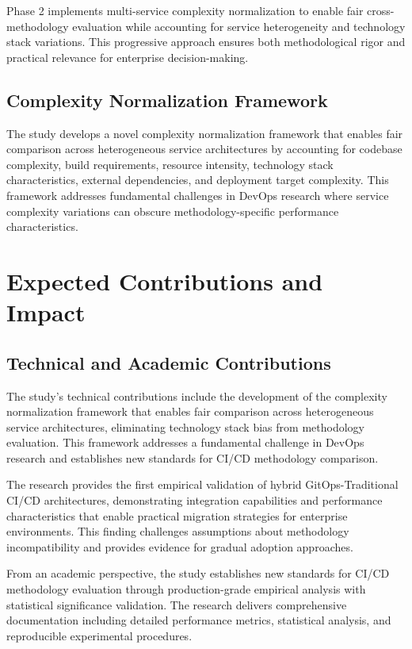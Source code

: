 Phase 2 implements multi-service complexity normalization to enable fair cross-methodology evaluation while accounting for service heterogeneity and technology stack variations. This progressive approach ensures both methodological rigor and practical relevance for enterprise decision-making.

\subsection{Complexity Normalization Framework}
The study develops a novel complexity normalization framework that enables fair comparison across heterogeneous service architectures by accounting for codebase complexity, build requirements, resource intensity, technology stack characteristics, external dependencies, and deployment target complexity. This framework addresses fundamental challenges in DevOps research where service complexity variations can obscure methodology-specific performance characteristics.

\section{Expected Contributions and Impact}

\subsection{Technical and Academic Contributions}
The study's technical contributions include the development of the complexity normalization framework that enables fair comparison across heterogeneous service architectures, eliminating technology stack bias from methodology evaluation. This framework addresses a fundamental challenge in DevOps research and establishes new standards for CI/CD methodology comparison.

The research provides the first empirical validation of hybrid GitOps-Traditional CI/CD architectures, demonstrating integration capabilities and performance characteristics that enable practical migration strategies for enterprise environments. This finding challenges assumptions about methodology incompatibility and provides evidence for gradual adoption approaches.

From an academic perspective, the study establishes new standards for CI/CD methodology evaluation through production-grade empirical analysis with statistical significance validation. The research delivers comprehensive documentation including detailed performance metrics, statistical analysis, and reproducible experimental procedures.

